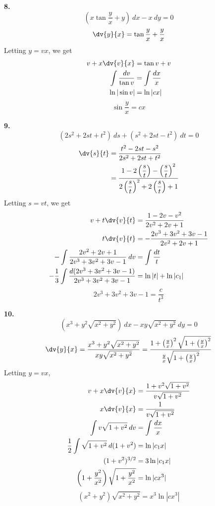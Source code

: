 \begin{exercise}
\begin{multicols}{2}
        \columnbreak

        \textbf{8.}
        \[ \left( x\tan \frac{y}{x} + y \right) \: d{x} - x \: d{y} = 0 \]
        \[ \dv{y}{x} = \tan \frac{y}{x} + \frac{y}{x} \]
        Letting $y = vx$, we get
        \begin{align*}
            v + x\dv{v}{x} &= \tan v + v \\
            \int{\frac{dv}{\tan v}} &= \int{\frac{dx}{x}} \\
            \ln|\sin v| &= \ln|cx|
        \end{align*}
        \[ \boxed{\sin \frac{y}{x} = cx} \]
    \end{multicols}
      \textbf{9.}
        \[ (2s^2+2st+t^2) \: d{s} + (s^2+2st-t^2) \: d{t} = 0 \]
        \begin{align*}
            \dv{s}{t} &= \frac{t^2 - 2st - s^2}{2s^2 + 2st + t^2} \\
            &= \frac{1 - 2\left(\dfrac{s}{t}\right) - \left(\dfrac{s}{t}\right)^2}{2\left(\dfrac{s}{t}\right)^2 + 2\left(\dfrac{s}{t}\right) + 1} \\
        \end{align*}
        Letting $s = vt$, we get
        \begin{align*}
            v + t\dv{v}{t} &= \frac{1-2v-v^2}{2v^2+2v+1} \\
            t\dv{v}{t} &= -\frac{2v^3+3v^2+3v-1}{2v^2+2v+1} \\
            -\int{\frac{2v^2+2v+1}{2v^3+3v^2+3v-1}} \: d{v} &= \int{\frac{dt}{t}} \\
            -\frac{1}{3} \int{\frac{d(2v^3+3v^2+3v-1)}{2v^3+3v^2+3v-1}} &= \ln|t| + \ln|c_1|
        \end{align*}
        \[ \boxed{2v^3 + 3v^2 + 3v -1 = \frac{c}{t^3}} \]

    \textbf{10.}
    \[ (x^3+y^2 \sqrt{x^2+y^2}) \: d{x} - xy \sqrt{x^2+y^2} \: d{y} = 0 \]
    \[ \dv{y}{x} = \frac{x^3+y^2 \sqrt{x^2+y^2}}{xy \sqrt{x^2+y^2}} = \frac{1+\left(\frac{y}{x}\right)^2 \sqrt{1 + \left(\frac{y}{x}\right)^2}}{\frac{y}{x}\sqrt{1+\left(\frac{y}{x}\right)^2}} \]
    Letting $y = vx$,
    \begin{align*}
        v + x \dv{v}{x} &= \frac{1 + v^2 \sqrt{1+v^2}}{v \sqrt{1+v^2}} \\
        x\dv{v}{x} &= \frac{1}{v \sqrt{1+v^2}} \\
        \int{v \sqrt{1+v^2}} \: d{v} &= \int{\frac{dx}{x}} \\
        \frac{1}{2} \int{\sqrt{1+v^2}} \: d{(1+v^2)} &= \ln|c_1x| \\
        (1+v^2)^{3/2} &= 3\ln|c_1x| \\
        \left( 1+\frac{y^2}{x^2} \right)\sqrt{1 + \frac{y^2}{x^2}} &= \ln|cx^3|
    \end{align*}
    \[ \boxed{(x^2+y^2)\sqrt{x^2+y^2} = x^3\ln|cx^3|} \]

\end{exercise}












